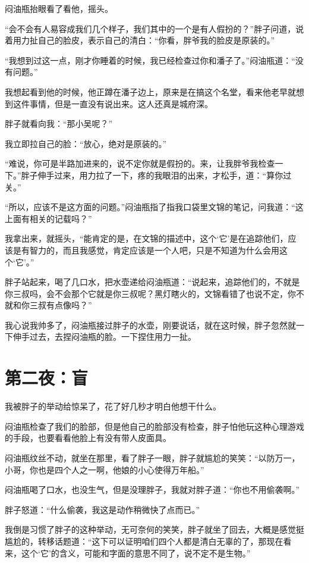 闷油瓶抬眼看了看他，摇头。

“会不会有人易容成我们几个样子，我们其中的一个是有人假扮的？”胖子问道，说着用力扯自己的脸皮，表示自己的清白：“你看，胖爷我的脸皮是原装的。”

“我想到过这一点，刚才你睡着的时候，我已经检查过你和潘子了。”闷油瓶道：“没有问题。”

我想起看到他的时候，他正蹲在潘子边上，原来是在搞这个名堂，看来他老早就想到这件事情，但是一直没有说出来。这人还真是城府深。

胖子就看向我：“那小吴呢？”

我立即拉自己的脸：“放心，绝对是原装的。”

“难说，你可是半路加进来的，说不定你就是假扮的。来，让我胖爷我检查一下。”胖子伸手过来，用力拉了一下，疼的我眼泪的出来，才松手，道：“算你过关。”

“所以，应该不是这方面的问题。”闷油瓶指了指我口袋里文锦的笔记，问我道：“这上面有相关的记载吗？”

我拿出来，就摇头，“能肯定的是，在文锦的描述中，这个‘它’是在追踪他们，应该是有智力的，而且我感觉，肯定应该是一个人吧，只是不知道为什么会用这个‘它’。”

胖子站起来，喝了几口水，把水壶递给闷油瓶道：“说起来，追踪他们的，不就是你三叔吗，会不会那个它就是你三叔呢？黑灯瞎火的，文锦看错了也说不定，你不就和你三叔有点像吗？”

我心说我帅多了，闷油瓶接过胖子的水壶，刚要说话，就在这时候，胖子忽然就一下伸手过去，去捏闷油瓶的脸。一下捏住用力一扯。

\chapter{第二夜：盲}

我被胖子的举动给惊呆了，花了好几秒才明白他想干什么。

闷油瓶检查了我们的脸部，但是他自己的脸部没有检查，胖子怕他玩这种心理游戏的手段，也要看看他脸上有没有带人皮面具。

闷油瓶纹丝不动，就坐在那里，看了胖子一眼，胖子就尴尬的笑笑：“以防万一，小哥，你也是四个人之一啊，他娘的小心使得万年船。”

闷油瓶喝了口水，也没生气，但是没理胖子，我就对胖子道：“你也不用偷袭啊。”

胖子怒道：“什么偷袭，我这是动作稍微快了点而已。”

我倒是习惯了胖子的这种举动，无可奈何的笑笑，胖子就坐了回去，大概是感觉挺尴尬的，转移话题道：“这下可以证明咱们四个人都是清白无辜的了，那现在看来，这个‘它’的含义，可能和字面的意思不同了，说不定不是生物。”

